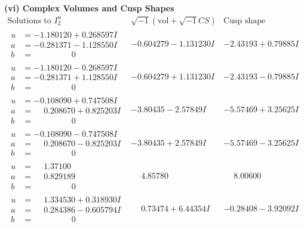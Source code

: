 \documentclass[1p]{elsarticle_modified}
\theoremstyle{definition}
\newcommand{\I}{\sqrt{-1}}
\begin{document}
\newpage\flushleft \textbf{(vi) Complex Volumes and Cusp Shapes}
$$\begin{array}{c|c|c}  
\text{Solutions to }I^u_{2}& \I (\text{vol} + \sqrt{-1}CS) & \text{Cusp shape}\\
 \hline 
\begin{aligned}
u &= -1.180120 + 0.268597 I \\
a &= -0.281371 - 1.128550 I \\
b &= \phantom{-0.000000 } 0\end{aligned}
 & -0.604279 - 1.131230 I & -2.43193 + 0.79885 I \\ \hline\begin{aligned}
u &= -1.180120 - 0.268597 I \\
a &= -0.281371 + 1.128550 I \\
b &= \phantom{-0.000000 } 0\end{aligned}
 & -0.604279 + 1.131230 I & -2.43193 - 0.79885 I \\ \hline\begin{aligned}
u &= -0.108090 + 0.747508 I \\
a &= \phantom{-}0.208670 + 0.825203 I \\
b &= \phantom{-0.000000 } 0\end{aligned}
 & -3.80435 - 2.57849 I & -5.57469 + 3.25625 I \\ \hline\begin{aligned}
u &= -0.108090 - 0.747508 I \\
a &= \phantom{-}0.208670 - 0.825203 I \\
b &= \phantom{-0.000000 } 0\end{aligned}
 & -3.80435 + 2.57849 I & -5.57469 - 3.25625 I \\ \hline\begin{aligned}
u &= \phantom{-}1.37100\phantom{ +0.000000I} \\
a &= \phantom{-}0.829189\phantom{ +0.000000I} \\
b &= \phantom{-0.000000 } 0\end{aligned}
 & \phantom{-}4.85780\phantom{ +0.000000I} & \phantom{-}8.00600\phantom{ +0.000000I} \\ \hline\begin{aligned}
u &= \phantom{-}1.334530 + 0.318930 I \\
a &= \phantom{-}0.284386 - 0.605794 I \\
b &= \phantom{-0.000000 } 0\end{aligned}
 & \phantom{-}0.73474 + 6.44354 I & -0.28408 - 3.92092 I \\ \hline\begin{aligned}

\end{aligned}
\end{array}$$
\end{document}
